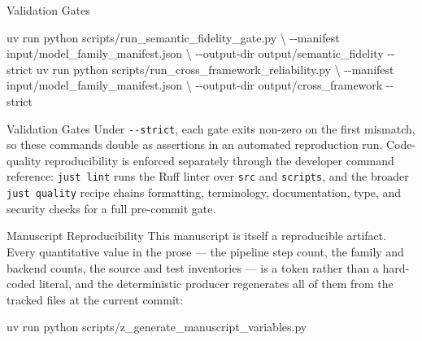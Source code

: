 \documentclass[
  ignorenonframetext,
]{beamer}
\newenvironment{Shaded}{}{}
\newcommand{\AttributeTok}[1]{\textcolor[rgb]{0.49,0.56,0.16}{#1}}
\newcommand{\DataTypeTok}[1]{\textcolor[rgb]{0.56,0.13,0.00}{#1}}
\newcommand{\ExtensionTok}[1]{#1}
\newcommand{\NormalTok}[1]{#1}
\begin{document}
\begin{frame}{Validation Gates}
\begin{Shaded}
\begin{Highlighting}[]
\ExtensionTok{uv}\NormalTok{ run python scripts/run\_semantic\_fidelity\_gate.py }\DataTypeTok{\textbackslash{}}
  \AttributeTok{{-}{-}manifest}\NormalTok{ input/model\_family\_manifest.json }\DataTypeTok{\textbackslash{}}
  \AttributeTok{{-}{-}output{-}dir}\NormalTok{ output/semantic\_fidelity }\AttributeTok{{-}{-}strict}
\ExtensionTok{uv}\NormalTok{ run python scripts/run\_cross\_framework\_reliability.py }\DataTypeTok{\textbackslash{}}
  \AttributeTok{{-}{-}manifest}\NormalTok{ input/model\_family\_manifest.json }\DataTypeTok{\textbackslash{}}
  \AttributeTok{{-}{-}output{-}dir}\NormalTok{ output/cross\_framework }\AttributeTok{{-}{-}strict}
\end{Highlighting}
\end{Shaded}

\end{frame}

\begin{frame}{Validation Gates}
Under \texttt{-\/-strict}, each gate exits non-zero on the first
mismatch, so these commands double as assertions in an automated
reproduction run. Code-quality reproducibility is enforced separately
through the developer command reference: \texttt{just\ lint} runs the
Ruff linter over \texttt{src} and \texttt{scripts}, and the broader
\texttt{just\ quality} recipe chains formatting, terminology,
documentation, type, and security checks for a full pre-commit gate.
\end{frame}

\begin{frame}{Manuscript Reproducibility}
\protect{}\label{manuscript-reproducibility}
This manuscript is itself a reproducible artifact. Every quantitative
value in the prose --- the pipeline step count, the family and backend
counts, the source and test inventories --- is a token rather than a
hard-coded literal, and the deterministic producer regenerates all of
them from the tracked files at the current commit:

\begin{Shaded}
\begin{Highlighting}[]
\ExtensionTok{uv}\NormalTok{ run python scripts/z\_generate\_manuscript\_variables.py}
\end{Highlighting}
\end{Shaded}

\end{frame}
\end{document}
